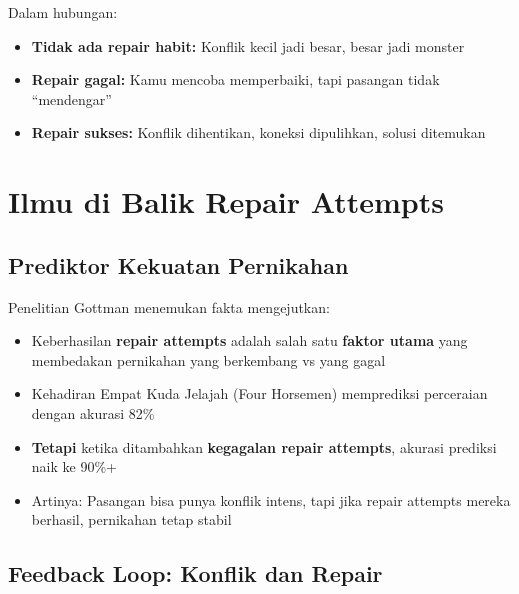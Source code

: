 Dalam hubungan:
\begin{itemize}
    \item \textbf{Tidak ada repair habit:} Konflik kecil jadi besar, besar jadi monster
    \item \textbf{Repair gagal:} Kamu mencoba memperbaiki, tapi pasangan tidak ``mendengar''
    \item \textbf{Repair sukses:} Konflik dihentikan, koneksi dipulihkan, solusi ditemukan
\end{itemize}

\section{Ilmu di Balik Repair Attempts}

\subsection{Prediktor Kekuatan Pernikahan}

Penelitian Gottman menemukan fakta mengejutkan:

\begin{warningbox}
\begin{itemize}
    \item Keberhasilan \textbf{repair attempts} adalah salah satu \textbf{faktor utama} yang membedakan pernikahan yang berkembang vs yang gagal
    \item Kehadiran Empat Kuda Jelajah (Four Horsemen) memprediksi perceraian dengan akurasi 82\%
    \item \textbf{Tetapi} ketika ditambahkan \textbf{kegagalan repair attempts}, akurasi prediksi naik ke 90\%+
    \item Artinya: Pasangan bisa punya konflik intens, tapi jika repair attempts mereka berhasil, pernikahan tetap stabil
\end{itemize}
\end{warningbox}

\subsection{Feedback Loop: Konflik dan Repair}

